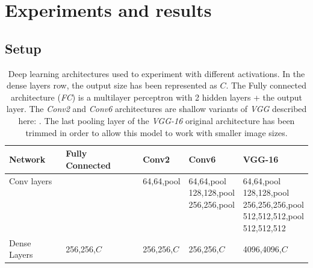 \documentclass[authoryear]{elsarticle}
\begin{document}
\section{Experiments and results} \label{sec:experiments}
\subsection{Setup}

\begin{table}[h] \small
	\caption{Deep learning architectures used to experiment with different activations. In the dense layers row, the output size has been represented as $C$. The Fully connected architecture (\textit{FC}) is a multilayer perceptron with 2 hidden layers + the output layer. The \textit{Conv2} and \textit{Conv6} architectures are shallow variants of \textit{VGG} described here: \citep{simonyan2015}. The last pooling layer of the \textit{VGG-16} original architecture has been trimmed in order to allow this model to work with smaller image sizes.}
	\setcellgapes{3pt}\makegapedcells
	\begin{tabular}[t]{lllll}
		\toprule
		Network              & Fully Connected & Conv2       & Conv6                                                & VGG-16                                                                                  \\ \midrule
		\makecell[l]{Conv layers\\\\\\\\\\} &                & \makecell[l]{64,64,pool\\\\\\\\\\}  & \makecell[l]{64,64,pool\\128,128,pool\\256,256,pool\\\\\\} & \makecell[l]{64,64,pool\\128,128,pool\\256,256,256,pool\\512,512,512,pool\\512,512,512} \\
		Dense Layers         & 256,256,$C$     & 256,256,$C$ & 256,256,$C$                                          & 4096,4096,$C$                                                                           \\

\end{tabular}
\end{table}
\end{document}
